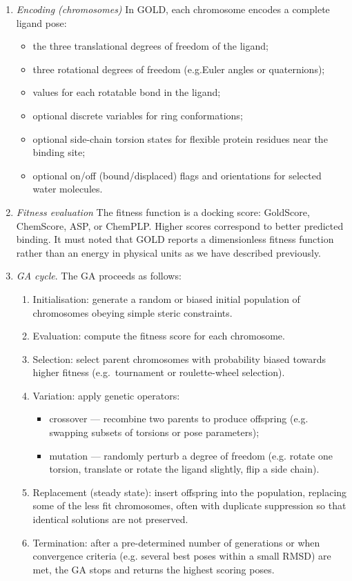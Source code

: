 \documentclass[12pt, a4paper]{article}
\begin{document}
\begin{enumerate}
\item \textit{Encoding (chromosomes)}
In GOLD, each chromosome encodes a complete ligand pose:
\begin{itemize}
    \item the three translational degrees of freedom of the ligand;
    \item three rotational degrees of freedom (e.g.Euler angles or quaternions);
    \item values for each rotatable bond in the ligand;
    \item optional discrete variables for ring conformations;
    \item optional side-chain torsion states for flexible protein residues near the binding site;
    \item optional on/off (bound/displaced) flags and orientations for selected water molecules.
\end{itemize}

\item \textit{Fitness evaluation}
The fitness function is a docking score: GoldScore, ChemScore, ASP, or ChemPLP. Higher scores correspond to better predicted binding. It must noted that GOLD reports a dimensionless fitness function rather than an energy in physical units as we have described previously.

\item \textit{GA cycle}.
The GA proceeds as follows:
\begin{enumerate}
    \item Initialisation: generate a random or biased initial population of chromosomes obeying simple steric constraints.
    \item Evaluation: compute the fitness score for each chromosome.
    \item Selection: select parent chromosomes with probability biased towards higher fitness (e.g.\ tournament or roulette-wheel selection).
    \item Variation: apply genetic operators:
    \begin{itemize}
        \item crossover — recombine two parents to produce offspring (e.g. swapping subsets of torsions or pose parameters);
        \item mutation — randomly perturb a degree of freedom (e.g. rotate one torsion, translate or rotate the ligand slightly, flip a side chain).
    \end{itemize}
    \item Replacement (steady state): insert offspring into the population, replacing some of the less fit chromosomes, often with duplicate suppression so that identical solutions are not preserved.
    \item Termination: after a pre-determined number of generations or when convergence criteria (e.g. several best poses within a small RMSD) are met, the GA stops and returns the highest scoring poses.
\end{enumerate}
\end{enumerate}
\end{document}
